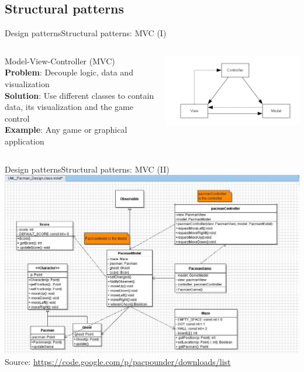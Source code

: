 \documentclass[10pt,compress]{beamer} %
\begin{document}
\subsection[Structural patterns]{Structural patterns}

\begin{frame}[plain]{Design patterns}{Structural patterns: MVC (I)}
    \begin{columns}
	   \begin{block}{Model-View-Controller (MVC)}
			\textbf{Problem}: Decouple logic, data and visualization\\
			\textbf{Solution}: Use different classes to contain data, its visualization and the game control\\
			\textbf{Example}: Any game or graphical application\\
		\end{block}
			\centering\includegraphics[width=\linewidth]{figs/mvc}\\
	\end{columns}
\end{frame}

\begin{frame}{Design patterns}{Structural patterns: MVC (II)}
	\includegraphics[width=0.9\linewidth]{figs/pacman}\\
	\centering \scriptsize{Source: \url{https://code.google.com/p/pacpounder/downloads/list}}
\end{frame}
\end{document}
